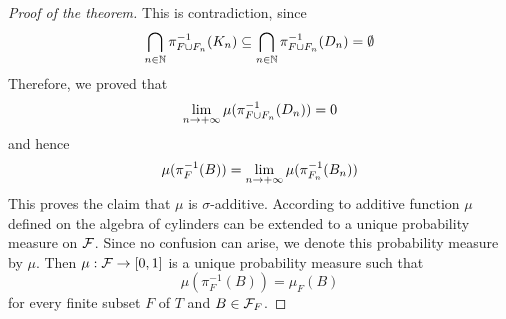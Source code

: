 \begin{proof}[Proof of the theorem]
This is contradiction, since
$$\bigcap_{n\in {\mathbb N}}\pi^{-1}_{F\cup F_n}(K_n) \subseteq \bigcap_{n\in {\mathbb N}}\pi^{-1}_{F\cup F_n}(D_n) = \emptyset$$
Therefore, we proved that 
$$\lim_{n\rightarrow +\infty}\mu(\pi^{-1}_{F\cup F_n}(D_n)) = 0$$
and hence
$$\mu(\pi_F^{-1}(B)) = \lim_{n\rightarrow +\infty}\mu(\pi^{-1}_{F_n}(B_n))$$
This proves the claim that $\mu$ is $\sigma$-additive. According to {\cite[Theorem 3.3]{Introduction_to_measure_theory}} additive function $\mu$ defined on the algebra of cylinders can be extended to a unique probability measure on ${\mathcal F}$. Since no confusion can arise, we denote this probability measure by $\mu$. Then $\mu:{\mathcal F}\rightarrow [0,1]$ is a unique probability measure such that 
$$\mu\left(\pi^{-1}_F(B)\right) = \mu_F(B)$$
for every finite subset $F$ of $T$ and $B\in {\mathcal F}_F$.
\end{proof}


\small


